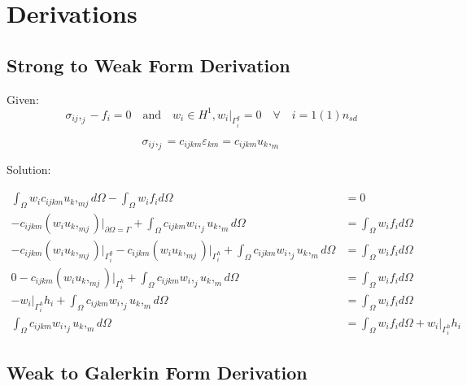 \documentclass[a4paper, 12pt]{article}
\begin{document}
\newpage
\section{Derivations} \label{sec:Derivations}

\subsection{Strong to Weak Form Derivation} \label{sec:WeakDer}

Given:
\begin{equation*}
\sigma_{ij},_{j} - f_{i} = 0 \quad \text{and} \quad
w_{i} \in H^1, w_{i}\Big|_{\Gamma^{g}_{i}} = 0
    \quad \forall \quad i=1(1)n_{sd}
\end{equation*}

\begin{equation*}
\sigma_{ij},_{j} = c_{ijkm} \varepsilon_{km} = c_{ijkm} u_{k},_{m}
\end{equation*}

\noindent
Solution:

\begin{align*}
\int_{\Omega} w_{i} c_{ijkm} u_{k},_{mj} d\Omega - 
  \int_{\Omega} w_{i} f_{i} d\Omega &= 0 \\
-c_{ijkm}(w_{i} u_{k},_{mj})\Big|_{\partial\Omega = \Gamma} 
  + \int_{\Omega} c_{ijkm} w_{i},_{j} u_{k},_{m} d\Omega
  &=\int_{\Omega} w_{i} f_{i} d\Omega  \\
-c_{ijkm}(w_{i} u_{k},_{mj})\Big|_{\Gamma^{g}_{i}} 
-c_{ijkm}(w_{i} u_{k},_{mj})\Big|_{\Gamma^{h}_{i}} 
  + \int_{\Omega} c_{ijkm} w_{i},_{j} u_{k},_{m} d\Omega
  &=\int_{\Omega} w_{i} f_{i} d\Omega \\
0
 -c_{ijkm}(w_{i} u_{k},_{mj})\Big|_{\Gamma^{h}_{i}} 
  + \int_{\Omega} c_{ijkm} w_{i},_{j} u_{k},_{m} d\Omega
  &=\int_{\Omega} w_{i} f_{i} d\Omega \\
-w_{i}\Big|_{\Gamma^{h}_{i}} h_{i}
  + \int_{\Omega} c_{ijkm} w_{i},_{j} u_{k},_{m} d\Omega
  &=\int_{\Omega} w_{i} f_{i} d\Omega \\
\int_{\Omega} c_{ijkm} w_{i},_{j} u_{k},_{m} d\Omega &=
  \int_{\Omega} w_{i} f_{i} d\Omega +
  w_{i}\Big|_{\Gamma^{h}_{i}} h_{i}
\end{align*}

\newpage
\subsection{Weak to Galerkin Form Derivation} \label{sec:GalerkinDer}
\end{document}
